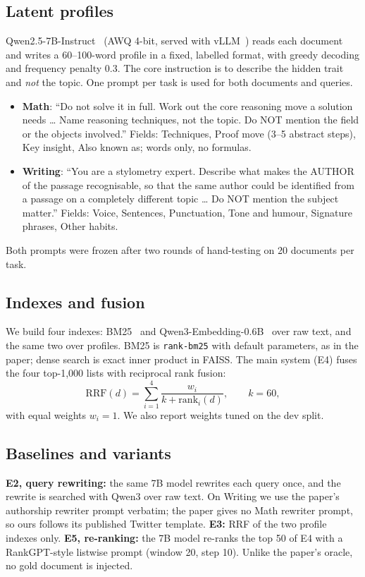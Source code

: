 \documentclass[conference]{IEEEtran}
\begin{document}
\subsection{Latent profiles}
Qwen2.5-7B-Instruct~\cite{qwen25} (AWQ 4-bit, served with vLLM~\cite{vllm}) reads each document and writes a 60--100-word profile in a fixed, labelled format, with greedy decoding and frequency penalty 0.3. The core instruction is to describe the hidden trait and \emph{not} the topic. One prompt per task is used for both documents and queries.
\begin{itemize}
\item \textbf{Math}: ``Do not solve it in full. Work out the core reasoning move a solution needs \ldots{} Name reasoning techniques, not the topic. Do NOT mention the field or the objects involved.'' Fields: Techniques, Proof move (3--5 abstract steps), Key insight, Also known as; words only, no formulas.
\item \textbf{Writing}: ``You are a stylometry expert. Describe what makes the AUTHOR of the passage recognisable, so that the same author could be identified from a passage on a completely different topic \ldots{} Do NOT mention the subject matter.'' Fields: Voice, Sentences, Punctuation, Tone and humour, Signature phrases, Other habits.
\end{itemize}
Both prompts were frozen after two rounds of hand-testing on 20 documents per task.

\subsection{Indexes and fusion}
We build four indexes: BM25~\cite{bm25} and Qwen3-Embedding-0.6B~\cite{qwen3emb} over raw text, and the same two over profiles. BM25 is \texttt{rank-bm25} with default parameters, as in the paper; dense search is exact inner product in FAISS. The main system (E4) fuses the four top-1,000 lists with reciprocal rank fusion:
\begin{equation}
\mathrm{RRF}(d)=\sum_{i=1}^{4}\frac{w_i}{k+\mathrm{rank}_i(d)},\qquad k=60,
\end{equation}
with equal weights $w_i=1$. We also report weights tuned on the dev split.

\subsection{Baselines and variants}
\textbf{E2, query rewriting:} the same 7B model rewrites each query once, and the rewrite is searched with Qwen3 over raw text. On Writing we use the paper's authorship rewriter prompt verbatim; the paper gives no Math rewriter prompt, so ours follows its published Twitter template.
\textbf{E3:} RRF of the two profile indexes only.
\textbf{E5, re-ranking:} the 7B model re-ranks the top 50 of E4 with a RankGPT-style listwise prompt (window 20, step 10). Unlike the paper's oracle, no gold document is injected.
\end{document}
